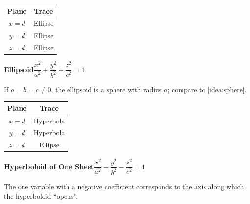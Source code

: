 \noindent
\begin{minipage}{\linewidth}
 \captionsetup{type=figure}%
 \noindent%
 \begin{minipage}[c]{.3\linewidth}
 \end{minipage}%
 \begin{minipage}[c]{.2\linewidth}
  \begin{tabular}{cc}
   \textbf{Plane}  & \textbf{Trace} \\\midrule
   $x=d$ & Ellipse\\
   $y=d$ & Ellipse\\
   $z=d$ & Ellipse
  \end{tabular}
 \end{minipage}%
 \begin{minipage}[c]{.5\linewidth}
 \end{minipage}
 \caption{\quad\textbf{Ellipsoid}\qquad$\dfrac{x^2}{a^2}+\dfrac{y^2}{b^2}+\dfrac{z^2}{c^2}=1$}
 \bigskip
  If $a=b=c\neq0$, the ellipsoid is a sphere with radius $a$; compare to \autoref{idea:sphere}.
\end{minipage}

\clearpage

\noindent
\begin{minipage}{\linewidth}
 \captionsetup{type=figure}%
 \noindent%
 \begin{minipage}[c]{.35\linewidth}
 \end{minipage}%
 \begin{minipage}[c]{.23\linewidth}
  \begin{tabular}{cc}
   \textbf{Plane}  & \textbf{Trace} \\\midrule
   $x=d$ & Hyperbola\\
   $y=d$ & Hyperbola\\
   $z=d$ & Ellipse
  \end{tabular}
 \end{minipage}%
 \begin{minipage}[c]{.4\linewidth}
 \end{minipage}
 \caption{\quad\textbf{Hyperboloid of One Sheet}\qquad$\dfrac{x^2}{a^2}+\dfrac{y^2}{b^2}-\dfrac{z^2}{c^2}=1$}
 \label{fig_hyperboloid_one_sheet}
 \bigskip
  The one variable with a negative coefficient corresponds to the axis along which the hyperboloid ``opens''.
\end{minipage}

